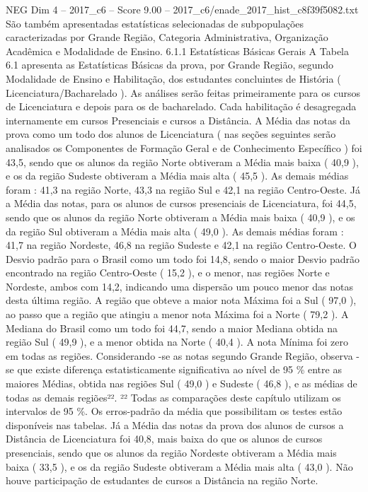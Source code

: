 \begin{textsample}{NEG Dim 4 – 2017\_c6 – Score 9.00 – 2017\_c6/enade\_2017\_hist\_c8f39f5082.txt}
São também apresentadas estatísticas selecionadas de subpopulações caracterizadas por Grande Região, Categoria Administrativa, Organização Acadêmica e Modalidade de Ensino. 6.1.1 Estatísticas Básicas Gerais A Tabela 6.1 apresenta as Estatísticas Básicas da prova, por Grande Região, segundo Modalidade de Ensino e Habilitação, dos estudantes concluintes de História ( Licenciatura/Bacharelado ).
As análises serão feitas primeiramente para os cursos de Licenciatura e depois para os de bacharelado.
Cada habilitação é desagregada internamente em cursos Presenciais e cursos a Distância.
A Média das notas da prova como um todo dos alunos de Licenciatura ( nas seções seguintes serão analisados os Componentes de Formação Geral e de Conhecimento Específico ) foi 43,5, sendo que os alunos da região Norte obtiveram a Média mais baixa ( 40,9 ), e os da região Sudeste obtiveram a Média mais alta ( 45,5 ).
As demais médias foram : 41,3 na região Norte, 43,3 na região Sul e 42,1 na região Centro-Oeste.
Já a Média das notas, para os alunos de cursos presenciais de Licenciatura, foi 44,5, sendo que os alunos da região Norte obtiveram a Média mais baixa ( 40,9 ), e os da região Sul obtiveram a Média mais alta ( 49,0 ).
As demais médias foram : 41,7 na região Nordeste, 46,8 na região Sudeste e 42,1 na região Centro-Oeste.
O Desvio padrão para o Brasil como um todo foi 14,8, sendo o maior Desvio padrão encontrado na região Centro-Oeste ( 15,2 ), e o menor, nas regiões Norte e Nordeste, ambos com 14,2, indicando uma dispersão um pouco menor das notas desta última região.
A região que obteve a maior nota Máxima foi a Sul ( 97,0 ), ao passo que a região que atingiu a menor nota Máxima foi a Norte ( 79,2 ).
A Mediana do Brasil como um todo foi 44,7, sendo a maior Mediana obtida na região Sul ( 49,9 ), e a menor obtida na Norte ( 40,4 ).
A nota Mínima foi zero em todas as regiões.
Considerando -se as notas segundo Grande Região, observa -se que existe diferença estatisticamente significativa ao nível de 95 \% entre as maiores Médias, obtida nas regiões Sul ( 49,0 ) e Sudeste ( 46,8 ), e as médias de todas as demais regiões²². ²² Todas as comparações deste capítulo utilizam os intervalos de 95 \%.
Os erros-padrão da média que possibilitam os testes estão disponíveis nas tabelas.
Já a Média das notas da prova dos alunos de cursos a Distância de Licenciatura foi 40,8, mais baixa do que os alunos de cursos presenciais, sendo que os alunos da região Nordeste obtiveram a Média mais baixa ( 33,5 ), e os da região Sudeste obtiveram a Média mais alta ( 43,0 ).
Não houve participação de estudantes de cursos a Distância na região Norte.

\end{textsample}
